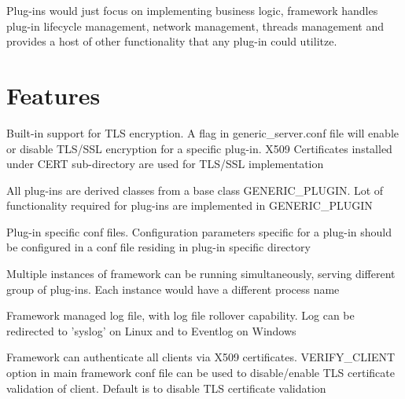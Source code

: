 Plug-\/ins would just focus on implementing business logic, framework handles plug-\/in lifecycle management, network management, threads management and provides a host of other functionality that any plug-\/in could utilitze.\hypertarget{index_FE}{}\section{Features}\label{index_FE}
\begin{DoxyItemize}
\item Built-\/in support for T\-L\-S encryption. A flag in generic\-\_\-server.\-conf file will enable or disable T\-L\-S/\-S\-S\-L encryption for a specific plug-\/in. X509 Certificates installed under C\-E\-R\-T sub-\/directory are used for T\-L\-S/\-S\-S\-L implementation\end{DoxyItemize}
\begin{DoxyItemize}
\item All plug-\/ins are derived classes from a base class G\-E\-N\-E\-R\-I\-C\-\_\-\-P\-L\-U\-G\-I\-N. Lot of functionality required for plug-\/ins are implemented in G\-E\-N\-E\-R\-I\-C\-\_\-\-P\-L\-U\-G\-I\-N\end{DoxyItemize}
\begin{DoxyItemize}
\item Plug-\/in specific conf files. Configuration parameters specific for a plug-\/in should be configured in a conf file residing in plug-\/in specific directory\end{DoxyItemize}
\begin{DoxyItemize}
\item Multiple instances of framework can be running simultaneously, serving different group of plug-\/ins. Each instance would have a different process name\end{DoxyItemize}
\begin{DoxyItemize}
\item Framework managed log file, with log file rollover capability. Log can be redirected to 'syslog' on Linux and to Eventlog on Windows\end{DoxyItemize}
\begin{DoxyItemize}
\item Framework can authenticate all clients via X509 certificates. V\-E\-R\-I\-F\-Y\-\_\-\-C\-L\-I\-E\-N\-T option in main framework conf file can be used to disable/enable T\-L\-S certificate validation of client. Default is to disable T\-L\-S certificate validation\end{DoxyItemize}

